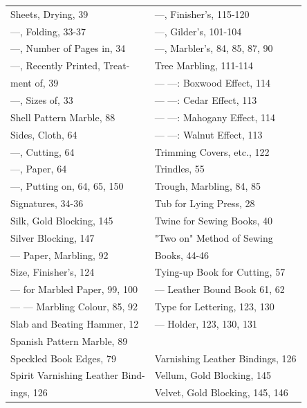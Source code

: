 \documentclass[twoside]{book}
\begin{document}
\begin{center}
\begin{tiny}
\begin{tabular}{l|l}
Sheets, Drying, 39                 & ---, Finisher's, 115-120           \\
---, Folding, 33-37                & ---, Gilder's, 101-104             \\
---, Number of Pages in, 34        & ---, Marbler's, 84, 85, 87, 90     \\
---, Recently Printed, Treat-      & Tree Marbling, 111-114             \\
    ment of, 39                    & --- ---: Boxwood Effect, 114       \\
---, Sizes of, 33                  & --- ---: Cedar Effect, 113         \\
Shell Pattern Marble, 88           & --- ---: Mahogany Effect, 114      \\
Sides, Cloth, 64                   & --- ---: Walnut Effect, 113        \\
---, Cutting, 64                   & Trimming Covers, etc., 122         \\
---, Paper, 64                     & Trindles, 55                       \\
---, Putting on, 64, 65, 150       & Trough, Marbling, 84, 85           \\
Signatures, 34-36                  & Tub for Lying Press, 28            \\
Silk, Gold Blocking, 145           & Twine for Sewing Books, 40         \\
Silver Blocking, 147               & "Two on" Method of Sewing          \\
--- Paper, Marbling, 92            &     Books, 44-46                   \\
Size, Finisher's, 124              & Tying-up Book for Cutting, 57      \\
--- for Marbled Paper, 99, 100     & --- Leather Bound Book 61, 62      \\
--- --- Marbling Colour, 85, 92    & Type for Lettering, 123, 130       \\
Slab and Beating Hammer, 12        & --- Holder, 123, 130, 131          \\
Spanish Pattern Marble, 89         &                                    \\
Speckled Book Edges, 79            & Varnishing Leather Bindings, 126   \\
Spirit Varnishing Leather Bind-    & Vellum, Gold Blocking, 145         \\
    ings, 126                      & Velvet, Gold Blocking, 145, 146    \\

\end{tabular}
\end{tiny}
\end{center}
\end{document}

